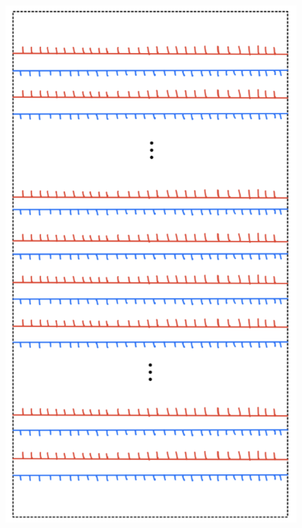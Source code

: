 \begin{figure}[H] 
    \centering
    \includegraphics[scale = 0.95]{diagrams/local_systems_on_as_diagrams/14.png} 
    \caption{}
    \label{fig:your-label}
\end{figure}

